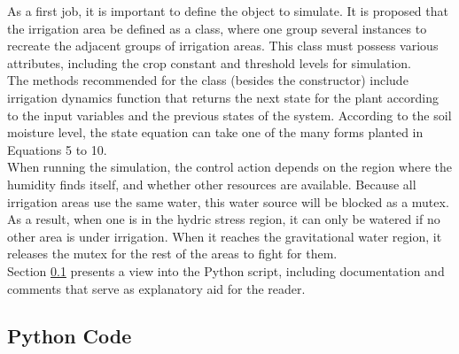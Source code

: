 \documentclass[12pt]{article}
\begin{document}
As a first job, it is important to define the object to simulate. It is proposed that the irrigation area be defined as a class, where one group several instances to recreate the adjacent groups of irrigation areas. This class must possess various attributes, including the crop constant and threshold levels for simulation. \\

The methods recommended for the class (besides the constructor) include irrigation dynamics function that returns the next state for the plant according to the input variables and the previous states of the system. According to the soil moisture level, the state equation can take one of the many forms planted in Equations 5 to 10. \\

When running the simulation, the control action depends on the region where the humidity finds itself, and whether other resources are available. Because all irrigation areas use the same water, this water source will be blocked as a mutex. As a result, when one is in the hydric stress region, it can only be watered if no other area is under irrigation. When it reaches the gravitational water region, it releases the mutex for the rest of the areas to fight for them. \\

Section \ref{code:1} presents a view into the Python script, including documentation and comments that serve as explanatory aid for the reader. \\

\subsection{Python Code}
\label{code:1}
\end{document}
